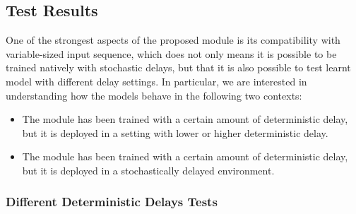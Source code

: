         \subsection{Test Results}
        \label{sub:res_test_delays}
            One of the strongest aspects of the proposed module is its compatibility with variable-sized input sequence, which does not only means it is possible to be trained natively with stochastic delays, but that it is also possible to test learnt model with different delay settings. In particular, we are interested in understanding how the models behave in the following two contexts:
            \begin{itemize}
                \setlength\itemsep{0.05em}
                \item The module has been trained with a certain amount of deterministic delay, but it is deployed in a setting with lower or higher deterministic delay. 
                \item The module has been trained with a certain amount of deterministic delay, but it is deployed in a stochastically delayed environment.
            \end{itemize}
            
            \subsubsection{Different Deterministic Delays Tests}
            
                \begin{table}[!b]
                    \centering
                    \caption{L2-TRPO trained on deterministic delays, denoted in the rows header, and Tested on deterministic delays, denoted in the columns header.}
                    \label{tab:l2trpo_det_det}
                \end{table}
                
